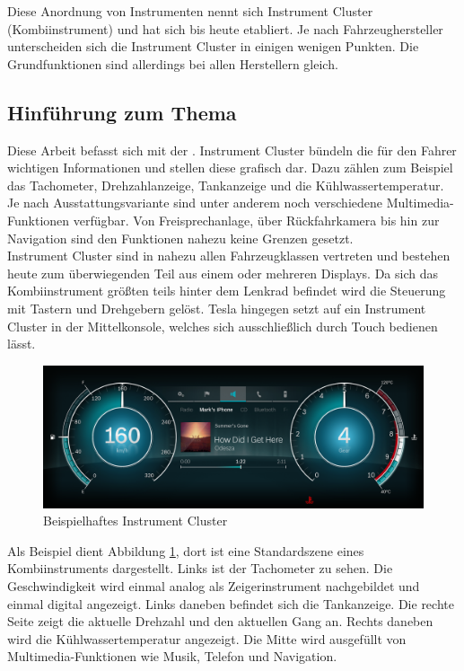 Diese Anordnung von Instrumenten nennt sich Instrument Cluster (Kombiinstrument) und hat sich bis heute etabliert. Je nach Fahrzeughersteller unterscheiden sich die Instrument Cluster in einigen wenigen Punkten. Die Grundfunktionen sind allerdings bei allen Herstellern gleich.\\

\subsection{Hinführung zum Thema}
Diese Arbeit befasst sich mit der \titleDocument. Instrument Cluster bündeln die für den Fahrer wichtigen Informationen und stellen diese grafisch dar. Dazu zählen zum Beispiel das Tachometer, Drehzahlanzeige, Tankanzeige und die Kühlwassertemperatur. Je nach Ausstattungsvariante sind unter anderem noch verschiedene Multimedia-Funktionen verfügbar. Von Freisprechanlage, über Rückfahrkamera bis hin zur Navigation sind den Funktionen nahezu keine Grenzen gesetzt.\\

Instrument Cluster sind in nahezu allen Fahrzeugklassen vertreten und bestehen heute zum überwiegenden Teil aus einem oder mehreren Displays. Da sich das Kombiinstrument größten teils hinter dem Lenkrad befindet wird die Steuerung mit Tastern und Drehgebern gelöst. Tesla hingegen setzt auf ein Instrument Cluster in der Mittelkonsole, welches sich ausschließlich durch Touch bedienen lässt.\\


\begin{figure}[htb]
	\centering
	\includegraphics[width=\textwidth]{img/1_einleitung/beispielHMI}
	\caption[Beispielhaftes Instrument Cluster]{Beispielhaftes Instrument Cluster \cite{bosch}}
	\label{fig:hmi}
\end{figure}

Als Beispiel dient Abbildung \ref{fig:hmi}, dort ist eine Standardszene eines Kombiinstruments dargestellt. Links ist der Tachometer zu sehen. Die Geschwindigkeit wird einmal analog als Zeigerinstrument nachgebildet und einmal digital angezeigt. Links daneben befindet sich die Tankanzeige. Die rechte Seite zeigt die aktuelle Drehzahl und den aktuellen Gang an. Rechts daneben wird die Kühlwassertemperatur angezeigt. Die Mitte wird ausgefüllt von Multimedia-Funktionen wie Musik, Telefon und Navigation.\\

